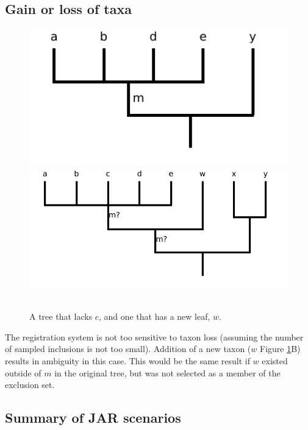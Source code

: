 \documentclass[11pt]{article}
\begin{document}
\subsection{Gain or loss of taxa}
\begin{figure}[h!]
   \centering  \includegraphics[scale=.5]{images/jar-sample-loss.pdf}
   \includegraphics[scale=.5]{images/jar-new-taxon.pdf}\\
   \\
   \caption{A tree that lacks $c$, and one that has a new leaf, $w$.}\label{jarGainLoss}
\end{figure}
The registration system is not too sensitive to taxon loss (assuming the number of sampled inclusions is not too small).
Addition of a new taxon ($w$ Figure \ref{jarGainLoss}B) results in ambiguity in this
  case.
This would be the same result if $w$ existed outside of $m$ in the original tree, but 
  was not selected as a member of the exclusion set.

\subsection{Summary of JAR scenarios}\label{scenarioSummary}
\end{document}
